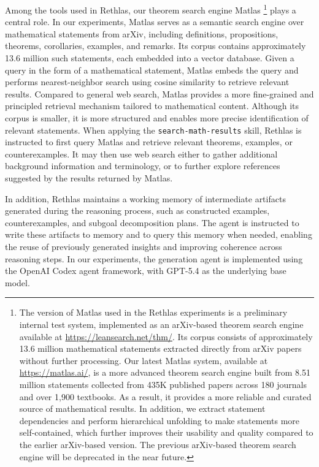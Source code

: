 \documentclass[]{pkuai4m}
\theoremstyle{plain}
\theoremstyle{definition}
\begin{document}
Among the tools used in Rethlas, our theorem search engine Matlas \footnote{The version of Matlas used in the Rethlas experiments is a preliminary internal test system, implemented as an arXiv-based theorem search engine available at \href{https://leansearch.net/thm/}{https://leansearch.net/thm/}. Its corpus consists of approximately 13.6 million mathematical statements extracted directly from arXiv papers without further processing. Our latest Matlas system, available at \href{https://matlas.ai/}{https://matlas.ai/}, is a more advanced theorem search engine built from 8.51 million statements collected from 435K published papers across 180 journals and over 1,900 textbooks. As a result, it provides a more reliable and curated source of mathematical results. In addition, we extract statement dependencies and perform hierarchical unfolding to make statements more self-contained, which further improves their usability and quality compared to the earlier arXiv-based version. The previous arXiv-based theorem search engine will be deprecated in the near future.} plays a central role. In our experiments, Matlas serves as a semantic search engine over mathematical statements from arXiv, including definitions, propositions, theorems, corollaries, examples, and remarks. Its corpus contains approximately 13.6 million such statements, each embedded into a vector database. Given a query in the form of a mathematical statement, Matlas embeds the query and performs nearest-neighbor search using cosine similarity to retrieve relevant results. Compared to general web search, Matlas provides a more fine-grained and principled retrieval mechanism tailored to mathematical content. Although its corpus is smaller, it is more structured and enables more precise identification of relevant statements. When applying the \texttt{search-math-results} skill, Rethlas is instructed to first query Matlas and retrieve relevant theorems, examples, or counterexamples. It may then use web search either to gather additional background information and terminology, or to further explore references suggested by the results returned by Matlas.

In addition, Rethlas maintains a working memory of intermediate artifacts generated during the reasoning process, such as constructed examples, counterexamples, and subgoal decomposition plans. The agent is instructed to write these artifacts to memory and to query this memory when needed, enabling the reuse of previously generated insights and improving coherence across reasoning steps. In our experiments, the generation agent is implemented using the OpenAI Codex agent framework, with GPT-5.4 as the underlying base model.
\end{document}
